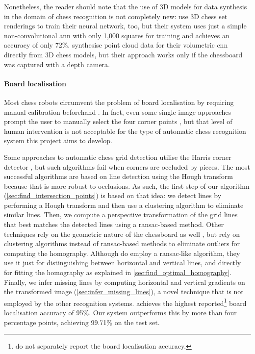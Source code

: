 \documentclass[../main.tex]{subfiles}
\begin{document}
Nonetheless, the reader should note that the use of 3D models for data synthesis in the domain of chess recognition is not completely new:
\textcite{hou} use 3D chess set renderings to train their neural network, too, but their system uses just a simple non-convolutional \gls{ann} with only 1,000 squares for training and achieves an accuracy of only 72\%.
\textcite{wei2017} synthesise point cloud data for their volumetric \gls{cnn} directly from 3D chess models, but their approach works only if the chessboard was captured with a depth camera.

\paragraph{Board localisation}
Most chess robots circumvent the problem of board localisation by requiring manual calibration beforehand \cite{goncalves2005,sokic2008,khan2014}.
In fact, even some single-image approaches prompt the user to manually select the four corner points \cite{danner2015}, but that level of human intervention is not acceptable for the type of automatic chess recognition system this project aims to develop.

Some approaches to automatic chess grid detection utilise the Harris corner detector \cite{banerjee2012,hack2014}, but such algorithms fail when corners are occluded by pieces.
The most successful algorithms are based on line detection using the Hough transform \cite{tam2008,neufeld2010,danner2015,chen2016,kanchibail2016,xie2018a,chen2019} because that is more robust to occlusions.
As such, the first step of our algorithm (\cref{sec:find_intersection_points}) is based on that idea: we detect lines by performing a Hough transform and then use a clustering algorithm to eliminate similar lines.
Then, we compute a perspective transformation of the grid lines that best matches the detected lines using a \gls{ransac}-based method.
Other techniques rely on the geometric nature of the chessboard as well \cite{tam2008,hack2014,danner2015,xie2018}, but rely on clustering algorithms instead of \gls{ransac}-based methods to eliminate outliers for computing the homography.
Although \textcite{hack2014} do employ a \gls{ransac}-like algorithm, they use it just for distinguishing between horizontal and vertical lines, and directly for fitting the homography as explained in \cref{sec:find_optimal_homography}.
Finally, we infer missing lines by computing horizontal and vertical gradients on the transformed image (\cref{sec:infer_missing_lines}), a novel technique that is not employed by the other recognition systems.
\Textcite{czyzewski2020} achieves the highest reported\footnote{ do not separately report the board localisation accuracy.} board localisation accuracy of 95\%.
Our system outperforms this by more than four percentage points, achieving 99.71\% on the test set.
\end{document}
